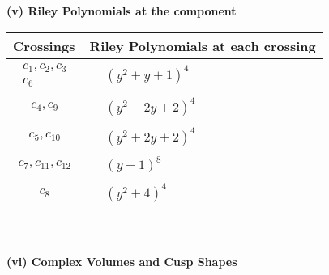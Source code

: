 \documentclass[1p]{elsarticle_modified}
\theoremstyle{definition}
\begin{document}
\newpage\renewcommand{\arraystretch}{1}
\flushleft \textbf{(v) Riley Polynomials at the component}\newline \\
\begin{tabular}{m{50pt}|m{274pt}}
Crossings & \hspace{64pt}Riley Polynomials at each crossing \\
\hline $$\begin{aligned}c_{1},c_{2},c_{3}\\c_{6}\end{aligned}$$&$\begin{aligned}
&(y^2+y+1)^4
\end{aligned}$\\
\hline $$\begin{aligned}c_{4},c_{9}\end{aligned}$$&$\begin{aligned}
&(y^2-2 y+2)^4
\end{aligned}$\\
\hline $$\begin{aligned}c_{5},c_{10}\end{aligned}$$&$\begin{aligned}
&(y^2+2 y+2)^4
\end{aligned}$\\
\hline $$\begin{aligned}c_{7},c_{11},c_{12}\end{aligned}$$&$\begin{aligned}
&(y-1)^8
\end{aligned}$\\
\hline $$\begin{aligned}c_{8}\end{aligned}$$&$\begin{aligned}
&(y^2+4)^4
\end{aligned}$\\
\hline
\end{tabular}\\~\\
\newpage\flushleft \textbf{(vi) Complex Volumes and Cusp Shapes}
\end{document}
